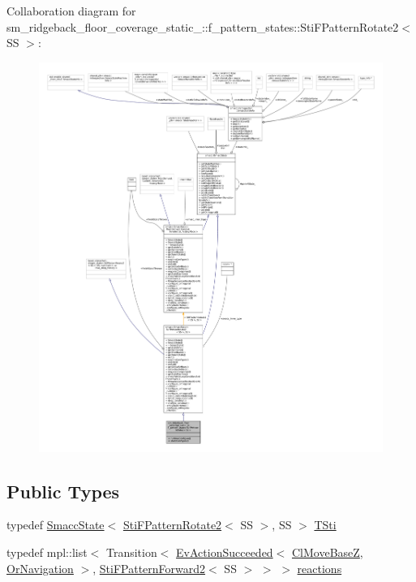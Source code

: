 Collaboration diagram for sm\+\_\+ridgeback\+\_\+floor\+\_\+coverage\+\_\+static\+\_\+:\+:f\+\_\+pattern\+\_\+states\+:\+:Sti\+F\+Pattern\+Rotate2$<$ SS $>$\+:
\nopagebreak
\begin{figure}[H]
\begin{center}
\leavevmode
\includegraphics[width=350pt]{classsm__ridgeback__floor__coverage__static__1_1_1f__pattern__states_1_1StiFPatternRotate2__coll__graph}
\end{center}
\end{figure}
\subsection*{Public Types}
\begin{DoxyCompactItemize}
\item 
typedef \hyperlink{classSmaccState}{Smacc\+State}$<$ \hyperlink{classsm__ridgeback__floor__coverage__static__1_1_1f__pattern__states_1_1StiFPatternRotate2}{Sti\+F\+Pattern\+Rotate2}$<$ SS $>$, SS $>$ \hyperlink{classsm__ridgeback__floor__coverage__static__1_1_1f__pattern__states_1_1StiFPatternRotate2_ab08090a9f9e8fa4635eed17d1c8c2e68}{T\+Sti}
\item 
typedef mpl\+::list$<$ Transition$<$ \hyperlink{structsmacc_1_1default__events_1_1EvActionSucceeded}{Ev\+Action\+Succeeded}$<$ \hyperlink{classcl__move__base__z_1_1ClMoveBaseZ}{Cl\+Move\+BaseZ}, \hyperlink{classsm__ridgeback__floor__coverage__static__1_1_1OrNavigation}{Or\+Navigation} $>$, \hyperlink{classsm__ridgeback__floor__coverage__static__1_1_1f__pattern__states_1_1StiFPatternForward2}{Sti\+F\+Pattern\+Forward2}$<$ SS $>$ $>$ $>$ \hyperlink{classsm__ridgeback__floor__coverage__static__1_1_1f__pattern__states_1_1StiFPatternRotate2_adc889d5fb137e13d27696f9530dc49b9}{reactions}
\end{DoxyCompactItemize}

